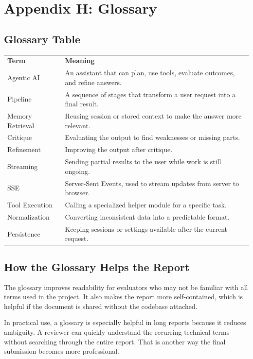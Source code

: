 \documentclass[11pt,oneside]{report}
\begin{document}
\chapter{Appendix H: Glossary}
\section{Glossary Table}
\begin{longtable}{p{}p{}}
\textbf{Term} & \textbf{Meaning} \\
Agentic AI & An assistant that can plan, use tools, evaluate outcomes, and refine answers. \\
Pipeline & A sequence of stages that transform a user request into a final result. \\
Memory Retrieval & Reusing session or stored context to make the answer more relevant. \\
Critique & Evaluating the output to find weaknesses or missing parts. \\
Refinement & Improving the output after critique. \\
Streaming & Sending partial results to the user while work is still ongoing. \\
SSE & Server-Sent Events, used to stream updates from server to browser. \\
Tool Execution & Calling a specialized helper module for a specific task. \\
Normalization & Converting inconsistent data into a predictable format. \\
Persistence & Keeping sessions or settings available after the current request. \\
\end{longtable}

\section{How the Glossary Helps the Report}
The glossary improves readability for evaluators who may not be familiar with all terms used in the project. It also makes the report more self-contained, which is helpful if the document is shared without the codebase attached.

In practical use, a glossary is especially helpful in long reports because it reduces ambiguity. A reviewer can quickly understand the recurring technical terms without searching through the entire report. That is another way the final submission becomes more professional.
\end{document}
